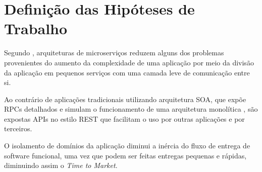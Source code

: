 \section{Definição das Hipóteses de Trabalho}

  Segundo , arquiteturas de microserviços reduzem
  alguns dos problemas provenientes do aumento da complexidade de uma aplicação
  por meio da divisão da aplicação em pequenos serviços com uma camada leve
  de comunicação entre si.

  Ao contrário de aplicações tradicionais utilizando arquitetura SOA, que expõe
  RPCs detalhados e simulam o funcionamento de uma arquitetura monolítica
  , são expostas APIs no estilo REST que facilitam o uso por
  outras aplicações e por terceiros.

  O isolamento de domínios da aplicação diminui a inércia do fluxo de entrega
  de software funcional, uma vez que podem ser feitas entregas pequenas e
  rápidas, diminuindo assim o \textit{Time to Market}.
